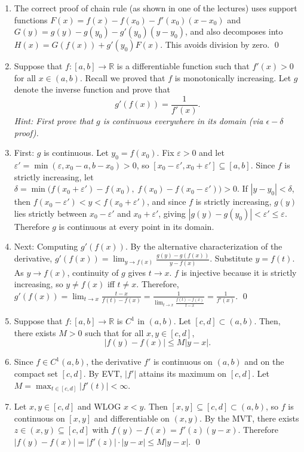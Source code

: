\documentclass[12pt]{article}
\newcommand{\R}{\mathbb{R}}
\newcommand{\eps}{\varepsilon}
\begin{document}
\begin{enumerate}
\item[] The correct proof of chain rule (as shown in one of the lectures) uses support functions $F(x) = f(x) - f(x_0) - f'(x_0)(x - x_0)$ and $G(y) = g(y) - g(y_0) - g'(y_0)(y - y_0)$, and also decomposes into $H(x) = G(f(x)) + g'(y_0)F(x)$. This avoids division by zero. \qed

\item Suppose that $f: [a,b] \to \R$ is a differentiable function such that $f'(x) > 0$ for all $x \in (a,b)$. Recall we proved that $f$ is monotonically increasing. Let $g$ denote the inverse function and prove that \[g'(f(x)) = \frac{1}{f'(x)}.\]
\textit{Hint: First prove that $g$ is continuous everywhere in its domain (via $\epsilon-\delta$ proof).}
\item[] First: $g$ is continuous. Let $y_0 = f(x_0)$. Fix $\eps > 0$ and let $\eps' = \min(\eps, x_0 - a, b - x_0) > 0$, so $[x_0 - \eps', x_0 + \eps'] \subseteq [a,b]$. Since $f$ is strictly increasing, let
$\delta = \min\!\bigl(f(x_0 + \eps') - f(x_0),\; f(x_0) - f(x_0 - \eps')\bigr) > 0.$
If $|y - y_0| < \delta$, then $f(x_0 - \eps') < y < f(x_0 + \eps')$, and since $f$ is strictly increasing, $g(y)$ lies strictly between $x_0 - \eps'$ and $x_0 + \eps'$, giving $|g(y) - g(y_0)| < \eps' \le \eps$. Therefore $g$ is continuous at every point in its domain.
 
\item[] Next: Computing $g'(f(x))$. By the alternative characterization of the derivative,
$g'(f(x)) = \lim_{y \to f(x)} \frac{g(y) - g(f(x))}{y - f(x)}.$
Substitute $y = f(t)$. As $y \to f(x)$, continuity of $g$ gives $t \to x$. $f$ is injective because it is strictly increasing, so $y \neq f(x)$ iff $t \neq x$. Therefore,
$g'(f(x)) = \lim_{t \to x} \frac{t - x}{f(t) - f(x)} = \frac{1}{\lim_{t \to x} \frac{f(t) - f(x)}{t - x}} = \frac{1}{f'(x)}.$ \qed

\item Suppose that $f:[a,b] \to \R$ is $C^1$ in $(a,b)$. Let $[c,d] \subset (a,b)$. Then, there exists $M > 0$ such that for all $x,y \in [c,d]$, \[|f(y) - f(x)| \leq M |y - x|.\]
\item[] Since $f \in C^1(a,b)$, the derivative $f'$ is continuous on $(a,b)$ and on the compact set $[c,d]$. By EVT, $|f'|$ attains its maximum on $[c,d]$. Let $M = \max_{t \in [c,d]} |f'(t)| < \infty.$
 
\item[] Let $x, y \in [c,d]$ and WLOG $x < y$. Then $[x,y] \subseteq [c,d] \subset (a,b)$, so $f$ is continuous on $[x,y]$ and differentiable on $(x,y)$. By the MVT, there exists $z \in (x,y) \subseteq [c,d]$ with $f(y) - f(x) = f'(z)(y-x).$ Therefore $|f(y) - f(x)| = |f'(z)| \cdot |y - x| \le M|y - x|.$ \qed


\end{enumerate}
\end{document}
